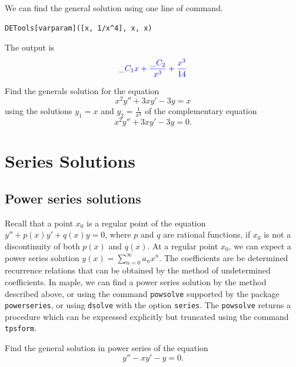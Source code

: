 \documentclass[
  12pt]{elegantbook}
\begin{document}
\begin{solution}
We can find the general solution using one line of command.

\begin{verbatim}
DETools[varparam]([x, 1/x^4], x, x)
\end{verbatim}

The output is
\[
\color{blue}{
  \_C_{1} x +\frac{\_C_{2}}{x^{3}}+\frac{x^{3}}{14}
}
\]
\end{solution}

\begin{exercise}
Find the generals solution for the equation
\[x^2y'' + 3xy' - 3y=x\]
using the solutions \(y_1=x\) and \(y_2=\frac{1}{x^3}\) of the complementary equation
\[x^2y'' + 3xy' - 3y=0.\]
\end{exercise}

\hypertarget{series-solutions}{%
\chapter{Series Solutions}\label{series-solutions}}

\hypertarget{power-series-solutions}{%
\section{Power series solutions}\label{power-series-solutions}}

Recall that a point \(x_0\) is a regular point of the equation \(y''+p(x)y'+q(x)y=0\), where \(p\) and \(q\) are rational functions, if \(x_0\) is not a discontinuity of both \(p(x)\) and \(q(x)\). At a regular point \(x_0\), we can expect a power series solution \(y(x)=\sum\limits_{n=0}^\infty a_nx^n\). The coefficients are be determined recurrence relations that can be obtained by the method of undetermined coefficients. In maple, we can find a power series solution by the method described above, or using the command \texttt{powsolve} supported by the package \texttt{powerseries}, or using \texttt{dsolve} with the option \texttt{series}. The \texttt{powsolve} returns a procedure which can be expressed explicitly but truncated using the command \texttt{tpsform}.

\begin{example}
Find the general solution in power series of the equation
\[y''-xy'-y=0.\]
\end{example}
\end{document}
